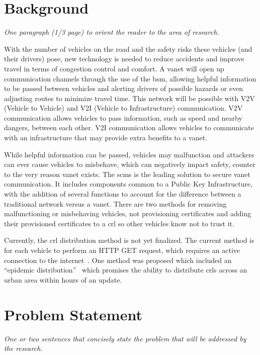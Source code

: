 \documentclass {article}
\newcommand{\sechint}[1]{\small{\emph{#1}} \bigskip}
\begin{document}
\tableofcontents
\pagebreak

\section{Background}{\sechint{One paragraph (1/3 page) to orient the reader to the area of research.}}

With the number of vehicles on the road and the safety risks these vehicles (and their drivers) pose, new technology is needed to reduce accidents and improve travel in terms of congestion control and comfort. A \gls{vanet} will open up communication channels through the use of the \gls{bsm}, allowing helpful information to be passed between vehicles and alerting drivers of possible hazards or even adjusting routes to minimize travel time. This network will be possible with V2V (Vehicle to Vehicle) and V2I (Vehicle to Infrastructure) communication. V2V communication allows vehicles to pass information, such as speed and nearby dangers, between each other. V2I communication allows vehicles to communicate with an infrastructure that may provide extra benefits to a \gls{vanet}.

While helpful information can be passed, vehicles may malfunction and attackers can ever cause vehicles to misbehave, which can negatively impact safety, counter to the very reason \gls{vanet} exists. The \gls{scms} is the leading solution to secure \gls{vanet} communication. It includes components common to a Public Key Infrastructure, with the addition of several functions to account for the difference between a traditional network versus a \gls{vanet}. There are two methods for removing malfunctioning or misbehaving vehicles, not provisioning certificates and adding their provisioned certificates to a \gls{crl} so other vehicles know not to trust it.

Currently, the \gls{crl} distribution method is not yet finalized. The current method is for each vehicle to perform an HTTP GET request, which requires an active connection to the internet~\autocite{brecht_scms_nodate}. One method was proposed which included an ``epidemic distribution''~\autocite{haas_efficient_2011} which promises the ability to distribute \gls{crl}s across an urban area within hours of an update.

\section{Problem Statement}{\sechint{One or two sentences that concisely state the problem that will be addressed by the research.}}
\end{document}
